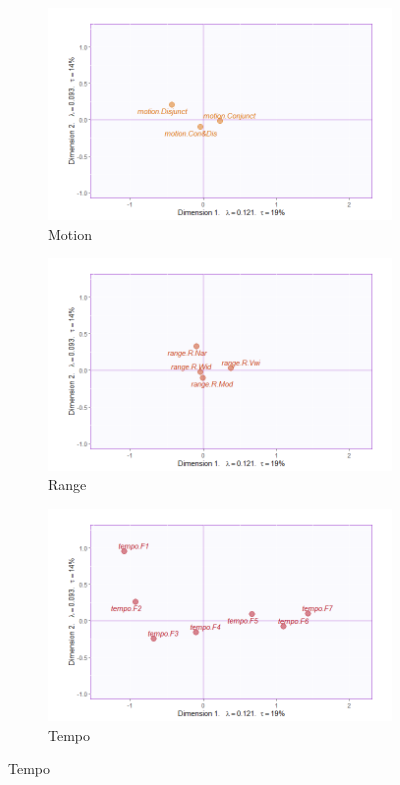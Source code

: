 \documentclass[
]{article}
\begin{document}
\begin{figure}[ht]\ContinuedFloat
\centering
\begin{subfigure}[b]{.45\linewidth}
\includegraphics[width=\linewidth]{./supmatsimgs/qjmotion.png}
\caption{Motion}\label{fig:motion}
\end{subfigure}
\begin{subfigure}[b]{.45\linewidth}
\includegraphics[width=\linewidth]{./supmatsimgs/qjrange.png}
\caption{Range}\label{fig:range}
\end{subfigure}

\begin{subfigure}[b]{.45\linewidth}
\includegraphics[width=\linewidth]{./supmatsimgs/qjtempo.png}
\caption{Tempo}\label{fig:tempo}
\end{subfigure}

\label{fig:qualities}
\end{figure}
\end{document}
